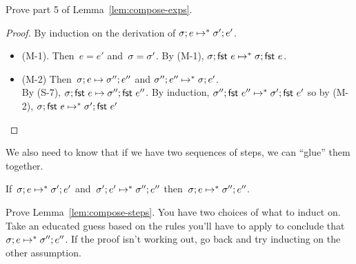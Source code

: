 \documentclass{article}
\begin{document}
\begin{task}
  Prove part 5 of Lemma~\ref{lem:compose-exps}.
\end{task}

\begin{proof}
  By induction on the derivation of
    $\sigma; e \mapsto^* \sigma'; e'$.
    \begin{itemize}
    \item (M-1). Then~$e = e'$ and~$\sigma = \sigma'$.
      By (M-1),
      $\sigma; \mathsf{fst}~e \mapsto^*
      \sigma; \mathsf{fst}~e$.
    \item (M-2)
      Then~$\sigma; e \mapsto \sigma''; e''$ 
      and $\sigma''; e'' \mapsto^* \sigma; e'$.\\
      By (S-7), 
      $\sigma; \mathsf{fst}~e \mapsto \sigma''; \mathsf{fst}~e''$.
      By induction,
      $\sigma''; \mathsf{fst}~e'' \mapsto^* \sigma'; \mathsf{fst}~e'$
      so by (M-2),
      $\sigma; \mathsf{fst}~e \mapsto^* \sigma'; \mathsf{fst}~e'$
    \end{itemize}
\end{proof}
  
We also need to know that if we have two sequences of steps, we can ``glue''
them together.

\begin{lemma}\label{lem:compose-steps}
  If~$\sigma; e \mapsto^* \sigma'; e'$
  and~$\sigma'; e' \mapsto^* \sigma''; e''$
  then~$\sigma; e \mapsto^* \sigma''; e''$.
\end{lemma}

\begin{task}
  Prove Lemma~\ref{lem:compose-steps}.
  You have two choices of what to induct on. Take an educated guess based on
  the rules you'll have to apply to conclude that
  $\sigma; e \mapsto^* \sigma''; e''$.
  If the proof isn't working out, go back and try inducting on the other
  assumption.
\end{task}
\end{document}
